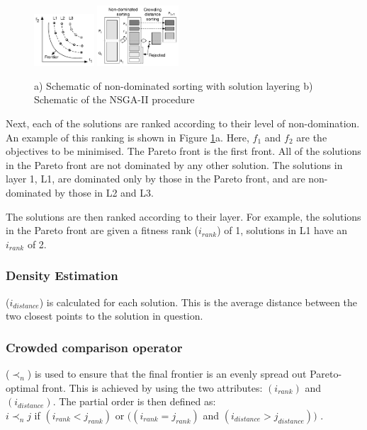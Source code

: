 \begin{figure}[t] 
	\vskip -10pt
	\center
	\includegraphics[width=0.2\textwidth]{Chapter6/figures/carbon_optimiser/paretofrontier/paretofrontier}
	\includegraphics[width=0.270\textwidth]{Chapter6/figures/carbon_optimiser/algsketch/sketch2}
	\vskip -8pt
	\caption{a) Schematic of non-dominated sorting with solution layering b) Schematic of the NSGA-II procedure}
	\label{fig:pareto-layering}
	\vskip -15pt
\end{figure}


Next, each of the solutions are ranked according to their level of non-domination. An example of this ranking is shown in Figure \ref{fig:pareto-layering}a. Here, $f_1$ and $f_2$ are the objectives to be minimised. The Pareto front is the first front. All of the solutions in the Pareto front are not dominated by any other solution. The solutions in layer 1, L1, are dominated only by those in the Pareto front, and are non-dominated by those in L2 and L3.

The solutions are then ranked according to their layer. For example, the solutions in the Pareto front are given a fitness rank ($i_{rank}$) of 1, solutions in L1 have an $i_{rank}$ of 2.

\subsubsection{Density Estimation}
($i_{distance}$) is calculated for each solution. This is the average distance between the two closest points to the solution in question. 


\subsubsection{Crowded comparison operator}
($\prec_n$) is used to ensure that the final frontier is an evenly spread out Pareto-optimal front. This is achieved by using the two attributes: $(i_{rank})$ and$(i_{distance})$. 
The partial order is then defined as:\\    
$i\prec_nj$ if $(i_{rank}<j_{rank})$ or $((i_{rank}=j_{rank})$ and  $(i_{distance}>j_{distance}))$ \cite{Valkanas2014}.


